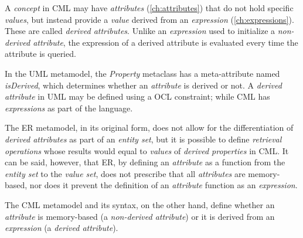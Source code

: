 A \emph{concept} in CML may have \emph{attributes} (\ref{ch:attributes})
that do not hold specific \emph{values},
but instead provide a \emph{value} derived from an \emph{expression} (\ref{ch:expressions}).
These are called \emph{derived attributes}.
Unlike an \emph{expression} used to initialize a \emph{non-derived attribute},
the expression of a derived attribute is evaluated
every time the attribute is queried.

In the UML \cite{uml} metamodel,
the \emph{Property} metaclass has a meta-attribute named \emph{isDerived},
which determines whether an \emph{attribute} is derived or not.
A \emph{derived attribute} in UML may be defined using a OCL \cite{ocl} constraint;
while CML has \emph{expressions} as part of the language.

The ER \cite{er} metamodel,
in its original form,
does not allow for the differentiation of \emph{derived attributes}
as part of an \emph{entity set},
but it is possible to define \emph{retrieval operations} whose
results would equal to \emph{values} of \emph{derived properties} in CML.
It can be said, however, that ER,
by defining an \emph{attribute} as a function from the \emph{entity set}
to the \emph{value set},
does not prescribe that all \emph{attributes} are memory-based,
nor does it prevent the definition of an \emph{attribute} function
as an \emph{expression}.

The CML metamodel and its syntax, on the other hand,
define whether an \emph{attribute} is memory-based (a \emph{non-derived attribute})
or it is derived from an \emph{expression} (a \emph{derived attribute}).
